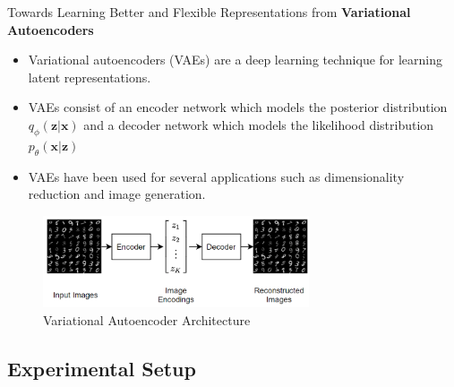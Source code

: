 \documentclass[hyperref={colorlinks,citecolor=blue,linkcolor=blue,urlcolor=blue}]{beamer}
\begin{document}
\begin{frame}{ Towards Learning Better and Flexible Representations from  \textbf{Variational Autoencoders} \vspace{0.3em}}
  \begin{itemize}
    \item Variational autoencoders (VAEs) are a deep learning technique for learning latent representations.
    \item VAEs consist of an encoder network which models the posterior distribution $q_{\phi}(\mathbf{z} | \mathbf{x})$ and a decoder network which models the likelihood distribution $p_{\theta}(\mathbf{x} | \mathbf{z})$
    \item VAEs have been used for several applications such as dimensionality reduction and image generation.
  \end{itemize}
  \vspace{0.5em}
  \pause
  \begin{center}
    \begin{figure}
      \includegraphics[width=0.7\textwidth]{./Images/vae.png}
      \caption{Variational Autoencoder Architecture}
    \end{figure}
  \end{center}
\end{frame}

\subsection{Experimental Setup}
\end{document}
